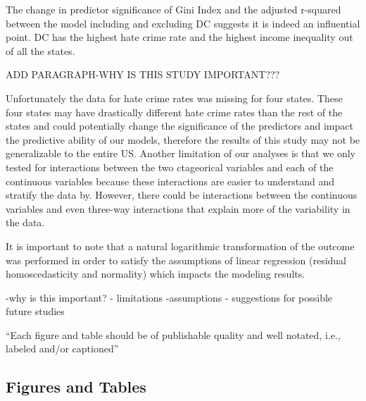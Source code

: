 \documentclass[
]{article}
\begin{document}
The change in predictor significance of Gini Index and the adjusted
r-squared between the model including and excluding DC suggests it is
indeed an influential point. DC has the highest hate crime rate and the
highest income inequality out of all the states.

ADD PARAGRAPH-WHY IS THIS STUDY IMPORTANT???

Unfortunately the data for hate crime rates was missing for four states.
These four states may have drastically different hate crime rates than
the rest of the states and could potentially change the significance of
the predictors and impact the predictive ability of our models,
therefore the results of this study may not be generalizable to the
entire US. Another limitation of our analyses is that we only tested for
interactions between the two ctageorical variables and each of the
continuous variables because these interactions are easier to understand
and stratify the data by. However, there could be interactions between
the continuous variables and even three-way interactions that explain
more of the variability in the data.

It is important to note that a natural logarithmic transformation of the
outcome was performed in order to satisfy the assumptions of linear
regression (residual homoscedasticity and normality) which impacts the
modeling results.

-why is this important? - limitations -assumptions - suggestions for
possible future studies

``Each figure and table should be of publishable quality and well
notated, i.e., labeled and/or captioned''

\hypertarget{figures-and-tables}{%
\subsection{Figures and Tables}\label{figures-and-tables}}
\end{document}
